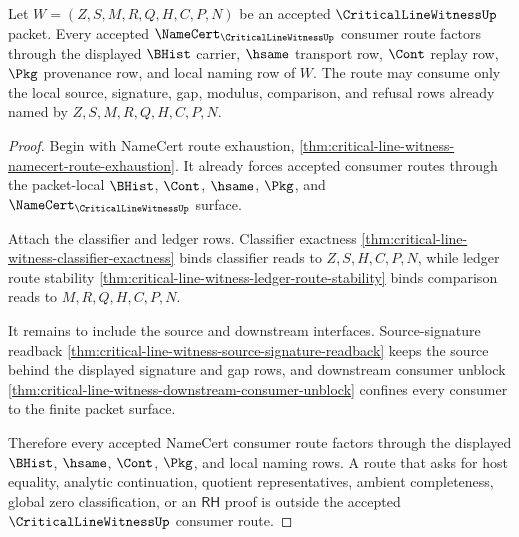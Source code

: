 \begin{theorem}
\label{thm:critical-line-witness-finite-namecert-consumer-route}
Let $W=(Z,S,M,R,Q,H,C,P,N)$ be an accepted $\CriticalLineWitnessUp$ packet.
Every accepted $\NameCert_{\CriticalLineWitnessUp}$ consumer route factors
through the displayed $\BHist$ carrier, $\hsame$ transport row, $\Cont$
replay row, $\Pkg$ provenance row, and local naming row of $W$. The route may
consume only the local source, signature, gap, modulus, comparison, and
refusal rows already named by $Z,S,M,R,Q,H,C,P,N$.
\end{theorem}
\begin{proof}
Begin with NameCert route exhaustion,
\autoref{thm:critical-line-witness-namecert-route-exhaustion}. It already
forces accepted consumer routes through the packet-local $\BHist$, $\Cont$,
$\hsame$, $\Pkg$, and $\NameCert_{\CriticalLineWitnessUp}$ surface.

Attach the classifier and ledger rows. Classifier exactness
\autoref{thm:critical-line-witness-classifier-exactness} binds classifier
reads to $Z,S,H,C,P,N$, while ledger route stability
\autoref{thm:critical-line-witness-ledger-route-stability} binds comparison
reads to $M,R,Q,H,C,P,N$.

It remains to include the source and downstream interfaces. Source-signature
readback \autoref{thm:critical-line-witness-source-signature-readback} keeps
the source behind the displayed signature and gap rows, and downstream
consumer unblock \autoref{thm:critical-line-witness-downstream-consumer-unblock}
confines every consumer to the finite packet surface.

Therefore every accepted NameCert consumer route factors through the
displayed $\BHist$, $\hsame$, $\Cont$, $\Pkg$, and local naming rows. A route
that asks for host equality, analytic continuation, quotient representatives,
ambient completeness, global zero classification, or an $\mathsf{RH}$ proof
is outside the accepted $\CriticalLineWitnessUp$ consumer route.
\end{proof}
